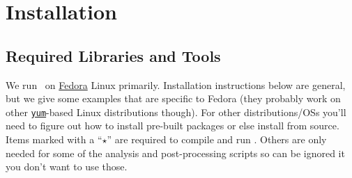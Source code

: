 \chapter{Installation}

\section{Required Libraries and Tools}

We run \glc\ on \href{http://fedoraproject.org/}{Fedora} Linux primarily. Installation instructions below are general, but we give some examples that are specific to Fedora (they probably work on other \href{http://yum.baseurl.org/}{{\tt yum}}-based Linux distributions though). For other distributions/OSs you'll need to figure out how to install pre-built packages or else install from source. Items marked with a ``$\star$'' are required to compile and run \glc. Others are only needed for some of the analysis and post-processing scripts so can be ignored it you don't want to use those.

